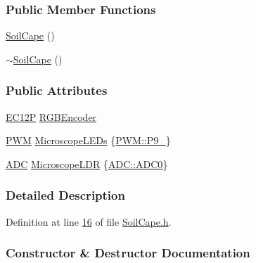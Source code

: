 \subsubsection*{Public Member Functions}
\begin{DoxyCompactItemize}
\item 
\hyperlink{class_hardware_1_1_soil_cape_acbe71c2b3132c35e3aa9fb619e193a10}{Soil\+Cape} ()
\item 
\hyperlink{class_hardware_1_1_soil_cape_acde8b92055d91a85b016623c7ccd5f5c}{$\sim$\+Soil\+Cape} ()
\end{DoxyCompactItemize}
\subsubsection*{Public Attributes}
\begin{DoxyCompactItemize}
\item 
\hyperlink{class_hardware_1_1_e_c12_p}{E\+C12\+P} \hyperlink{class_hardware_1_1_soil_cape_a0e68dc6f30fdcbff0462d2996e47a338}{R\+G\+B\+Encoder}
\item 
\hyperlink{class_hardware_1_1_p_w_m}{P\+W\+M} \hyperlink{class_hardware_1_1_soil_cape_a80d499485dddb861cddaffa439b655dd}{Microscope\+L\+E\+Ds} \{\hyperlink{class_hardware_1_1_p_w_m_a7cc6acf1c28f0eaef16246635dc0353aa68cc50c029ae66d2fa7014839e40f771}{P\+W\+M\+::\+P9\+\_}\}
\item 
\hyperlink{class_hardware_1_1_a_d_c}{A\+D\+C} \hyperlink{class_hardware_1_1_soil_cape_a7a6d0bcfcba2d65f4c19ab41cbaace46}{Microscope\+L\+D\+R} \{\hyperlink{class_hardware_1_1_a_d_c_adb1507998c096cbdf7031527f6a690cfaaad3628f17c4d36b8d16123e7017ad63}{A\+D\+C\+::\+A\+D\+C0}\}
\end{DoxyCompactItemize}


\subsubsection{Detailed Description}


Definition at line \hyperlink{_soil_cape_8h_source_l00016}{16} of file \hyperlink{_soil_cape_8h_source}{Soil\+Cape.\+h}.



\subsubsection{Constructor \& Destructor Documentation}
\hypertarget{class_hardware_1_1_soil_cape_acbe71c2b3132c35e3aa9fb619e193a10}{}
